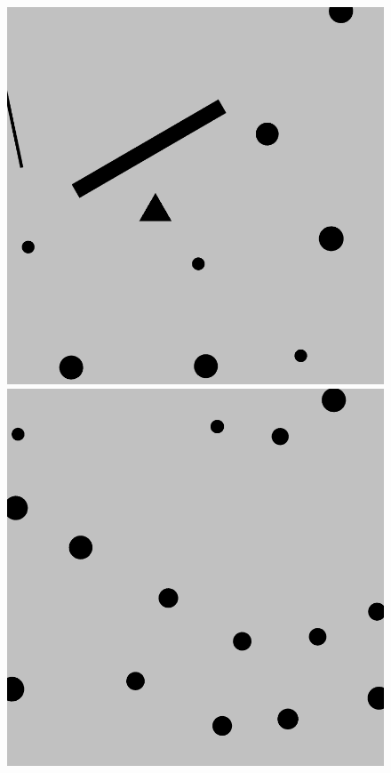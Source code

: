 \documentclass{beamer}
\begin{document}
\begin{frame}
\begin{figure}[H]
\begin{columns}
\begin{column}{0.14\textwidth}
							\includegraphics[width=1\linewidth]{graphics/test_model_11_2.png}
							\includegraphics[width=1\linewidth]{graphics/test_model_15_2.png}
						\end{column}

\end{columns}
\end{figure}
\end{frame}
\end{document}
